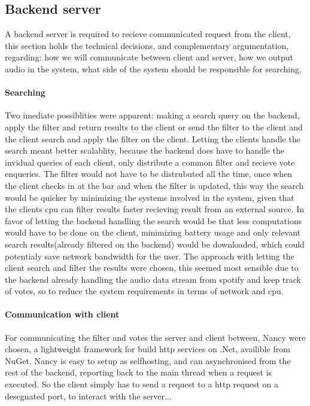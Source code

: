\subsection{Backend server}

	A backend server is required to recieve communicated request from the client, this section holds the technical decisions, and complementary argumentation, regarding: how we will communicate between client and server, how we output audio in the system, what side of the system should be responsible for searching.

	\paragraph{Searching}
	Two imediate possiblities were apparent: making a search query on the backend, apply the filter and return results to the client or send the filter to the client and the client search and apply the filter on the client.
	Letting the clients handle the search meant better scalablity, because the backend does have to handle the invidual queries of each client, only distribute a common filter and recieve vote enqueries. The filter would not have to be distrubuted all the time, once when the client checks in at the bar and when the filter is updated, this way the search would be quicker by minimizing the systems involved in the system, given that the clients cpu can filter results faster recieving result from an external source. In favor of letting the backend handling the search would be that less computations would have to be done on the client, minimizing battery usage and only relevant search results(already filtered on the backend) would be downloaded, which could potentialy save network bandwidth for the user. The approach with letting the client search and filter the results were chosen, this seemed most sensible due to the backend already handling the audio data stream from spotify and keep track of votes, so to reduce the system requirements in terms of network and cpu.

	\paragraph{Communication with client}
	For communicating the filter and votes the server and client between, Nancy \cite{nancy} were chosen, a lightweight framework for build http services on .Net, availible from NuGet. Nancy is easy to setup as selfhosting, and can asynchronised from the rest of the backend, reporting back to the main thread when a request is executed. So the client simply has to send a request to a http request on a desegnated port, to interact with the server...  

